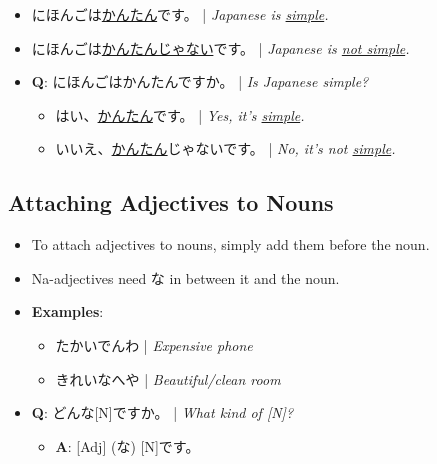 \documentclass{article}
\begin{document}
\begin{CJK}{UTF8}{min}
\begin{itemize}
\item にほんごは\uline{かんたん}です。 | \emph{Japanese is \uline{simple}.}
\item にほんごは\uline{かんたんじゃない}です。 | \emph{Japanese is \uline{not simple}.}
\item {\bf Q}: にほんごはかんたんですか。 | \emph{Is Japanese simple?}
\begin{itemize}
\item はい、\uline{かんたん}です。 | \emph{Yes, it's \uline{simple}.}
\item いいえ、\uline{かんたん}じゃないです。 | \emph{No, it's not \uline{simple}.}
\end{itemize}
\end{itemize}

\subsection{Attaching Adjectives to Nouns}

\begin{itemize}
\item To attach adjectives to nouns, simply add them before the noun.
\item Na-adjectives need な in between it and the noun.
\item {\bf Examples}:
\begin{itemize}
\item たかいでんわ | \emph{Expensive phone}
\item きれいなへや | \emph{Beautiful/clean room}
\end{itemize}
\item {\bf Q}: どんな[N]ですか。 | \emph{What kind of [N]?}
\begin{itemize}
\item {\bf A}: [Adj] (な) [N]です。
\end{itemize}
\end{itemize}










\end{CJK}
\end{document}
